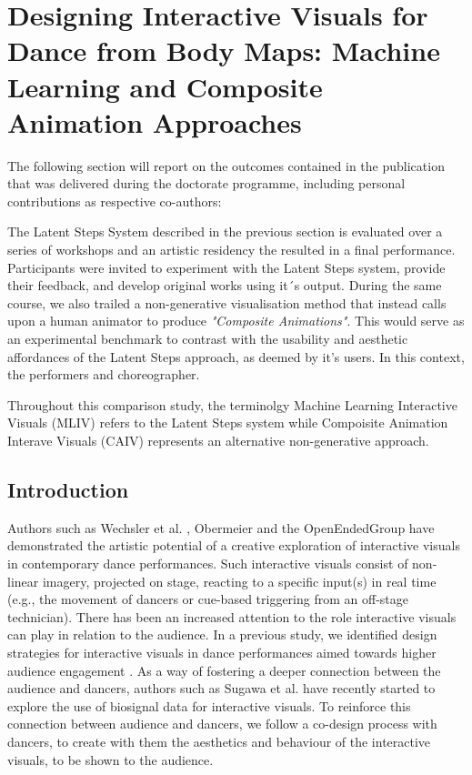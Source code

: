 \section[Designing Interactive Visuals from Body Maps]{Designing Interactive Visuals for Dance from Body Maps: Machine Learning and Composite Animation Approaches}
\label{case_studies:modi_dis}

The following section will report on the outcomes contained in the publication that was delivered during the doctorate programme, including personal contributions as respective co-authors: 


The Latent Steps System described in the previous section is evaluated over a series of workshops and an artistic residency the resulted in a final performance. Participants were invited to experiment with the Latent Steps system, provide their feedback, and develop original works using it´s output. During the same course, we also trailed a non-generative visualisation method that instead calls upon a human animator to produce \textit{"Composite Animations"}. This would serve as an experimental benchmark to contrast with the usability and aesthetic affordances of the Latent Steps approach, as deemed by it's users. In this context, the performers and choreographer.

Throughout this comparison study, the terminolgy Machine Learning Interactive Visuals (MLIV) refers to the Latent Steps system while Compoisite Animation Interave Visuals (CAIV) represents an alternative non-generative approach.

\subsection{Introduction}

Authors such as Wechsler et al. \cite{weis_eyecon_2004}, Obermeier \cite{monteverdi_klaus_2007} and the OpenEndedGroup \cite{downie_choreographing_2005} have demonstrated the artistic potential of a creative exploration of interactive visuals in contemporary dance performances. Such interactive visuals consist of non-linear imagery, projected on stage, reacting to a specific input(s) in real time (e.g., the movement of dancers or cue-based triggering from an off-stage technician). There has been an increased attention to the role interactive visuals can play in relation to the audience. In a previous study, we identified design strategies for interactive visuals in dance performances aimed towards higher audience engagement \cite{correia_connected_2021}. As a way of fostering a deeper connection between the audience and dancers, authors such as Sugawa et al. \cite{sugawa_boiling_2021} have recently started to explore the use of biosignal data for interactive visuals. To reinforce this connection between audience and dancers, we follow a co-design process with dancers, to create with them the aesthetics and behaviour of the interactive visuals, to be shown to the audience.

